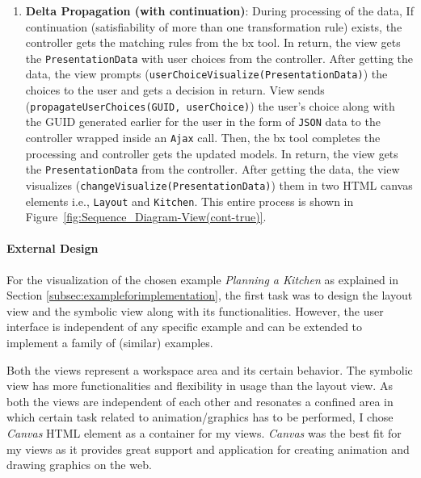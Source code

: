 \begin{enumerate}
	\item {\textbf{Delta Propagation (with continuation)}: During processing of the data, If continuation (satisfiability of more than one transformation rule) exists, the controller gets the matching rules from the bx tool. In return, the view gets the \texttt{PresentationData} with user choices from the controller. After getting the data, the view 
	prompts (\texttt{userChoiceVisualize(PresentationData)}) the choices to the user and gets a decision in return. 
	View sends (\texttt{propagateUserChoices(GUID, userChoice)}) the user's choice along with the GUID generated earlier for the user in the form of \texttt{JSON} data to the controller wrapped inside an \texttt{Ajax} call. Then, the bx tool completes the processing and controller gets the updated models. In return, the view gets the \texttt{PresentationData} from the controller. After getting the data, the view visualizes (\texttt{changeVisualize(PresentationData)}) them in two HTML canvas elements i.e., \texttt{Layout} and \texttt{Kitchen}. This entire process is shown in Figure~\ref{fig:Sequence_Diagram-View(cont-true)}.}
\end{enumerate}

\paragraph{External Design}
For the visualization of the chosen example \textit{Planning a Kitchen} as explained in Section \ref{subsec:exampleforimplementation}, the first task was to design the layout view and the symbolic view along with its functionalities. However, the user interface is independent of any specific example and can be extended to implement a family of (similar) examples.

Both the views represent a workspace area and its certain behavior. The symbolic view has more functionalities and flexibility in usage than the layout view. As both the views are independent of each other and resonates a confined area in which certain task related to animation/graphics has to be performed, I chose \textit{Canvas} \cite{canvas} HTML element as a container for my views. \textit{Canvas} was the best fit for my views as it provides great support and application for creating animation and drawing graphics on the web.


